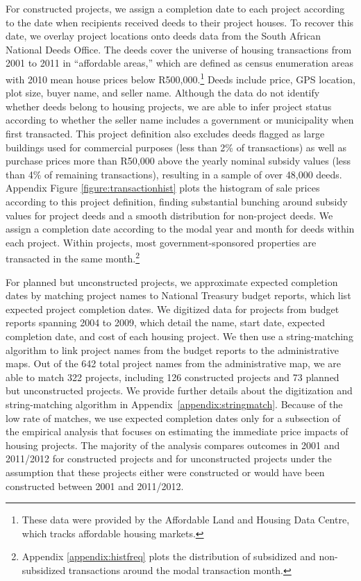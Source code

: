 \documentclass[12pt]{article}
\begin{document}
For constructed projects, we assign a completion date to each project according to the date when recipients received deeds to their project houses.  To recover this date, we overlay project locations onto deeds data from the South African National Deeds Office.  The deeds cover the universe of housing transactions from 2001 to 2011 in ``affordable areas,'' which are defined as census enumeration areas with 2010 mean house prices below R500,000.\footnote{These data were provided by the Affordable Land and Housing Data Centre, which tracks affordable housing markets.} Deeds include price, GPS location, plot size, buyer name, and seller name.  Although the data do not identify whether deeds belong to housing projects, we are able to infer project status according to whether the seller name includes a government or municipality when first transacted.  This project definition also excludes deeds flagged as large buildings used for commercial purposes (less than 2\% of transactions) as well as purchase prices more than R50,000 above the yearly nominal subsidy values (less than 4\% of remaining transactions), resulting in a sample of over 48,000 deeds.  Appendix Figure \ref{figure:transactionhist} plots the histogram of sale prices according to this project definition, finding substantial bunching around subsidy values for project deeds and a smooth distribution for non-project deeds.  We assign a completion date according to the modal year and month for deeds within each project.  Within projects, most government-sponsored properties are transacted in the same month.\footnote{Appendix \ref{appendix:histfreq} plots the distribution of subsidized and non-subsidized transactions around the modal transaction month.} 

For planned but unconstructed projects, we approximate expected completion dates by matching project names to National Treasury budget reports, which list expected project completion dates.  We digitized data for projects from budget reports spanning 2004 to 2009, which detail the name, start date, expected completion date, and cost of each housing project.  We then use a string-matching algorithm to link project names from the budget reports to the administrative maps.  Out of the 642 total project names from the administrative map, we are able to match 322 projects, including 126 constructed projects and 73 planned but unconstructed projects.  We provide further details about the digitization and string-matching algorithm in Appendix~\ref{appendix:stringmatch}.  Because of the low rate of matches, we use expected completion dates only for a subsection of the empirical analysis that focuses on estimating the immediate price impacts of housing projects.  The majority of the analysis compares outcomes in 2001 and 2011/2012 for constructed projects and for unconstructed projects under the assumption that these projects either were constructed or would have been constructed between 2001 and 2011/2012.
\end{document}

